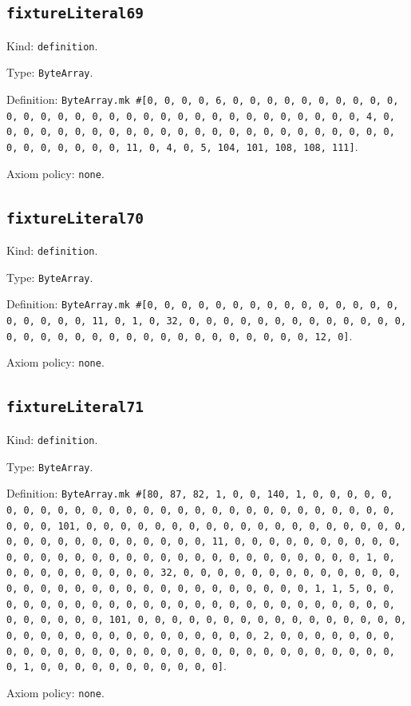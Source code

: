 \documentclass[11pt]{article}
\begin{document}
\subsection*{\texttt{fixtureLiteral69}}
\noindent Kind: \texttt{definition}.\par
\noindent Type: \texttt{ByteArray}.\par
\noindent Definition: \texttt{ByteArray.mk \#[0, 0, 0, 0, 6, 0, 0, 0, 0, 0, 0, 0, 0, 0, 0, 0, 0, 0, 0, 0, 0, 0, 0, 0, 0, 0, 0, 0, 0, 0, 0, 0, 0, 0, 0, 0, 4, 0, 0, 0, 0, 0, 0, 0, 0, 0, 0, 0, 0, 0, 0, 0, 0, 0, 0, 0, 0, 0, 0, 0, 0, 0, 0, 0, 0, 0, 0, 0, 11, 0, 4, 0, 5, 104, 101, 108, 108, 111]}.\par
\noindent Axiom policy: \texttt{none}.\par
\subsection*{\texttt{fixtureLiteral70}}
\noindent Kind: \texttt{definition}.\par
\noindent Type: \texttt{ByteArray}.\par
\noindent Definition: \texttt{ByteArray.mk \#[0, 0, 0, 0, 0, 0, 0, 0, 0, 0, 0, 0, 0, 0, 0, 0, 0, 0, 0, 0, 11, 0, 1, 0, 32, 0, 0, 0, 0, 0, 0, 0, 0, 0, 0, 0, 0, 0, 0, 0, 0, 0, 0, 0, 0, 0, 0, 0, 0, 0, 0, 0, 0, 0, 0, 0, 12, 0]}.\par
\noindent Axiom policy: \texttt{none}.\par
\subsection*{\texttt{fixtureLiteral71}}
\noindent Kind: \texttt{definition}.\par
\noindent Type: \texttt{ByteArray}.\par
\noindent Definition: \texttt{ByteArray.mk \#[80, 87, 82, 1, 0, 0, 140, 1, 0, 0, 0, 0, 0, 0, 0, 0, 0, 0, 0, 0, 0, 0, 0, 0, 0, 0, 0, 0, 0, 0, 0, 0, 0, 0, 0, 0, 0, 0, 0, 101, 0, 0, 0, 0, 0, 0, 0, 0, 0, 0, 0, 0, 0, 0, 0, 0, 0, 0, 0, 0, 0, 0, 0, 0, 0, 0, 0, 0, 0, 0, 0, 11, 0, 0, 0, 0, 0, 0, 0, 0, 0, 0, 0, 0, 0, 0, 0, 0, 0, 0, 0, 0, 0, 0, 0, 0, 0, 0, 0, 0, 0, 0, 0, 1, 0, 0, 0, 0, 0, 0, 0, 0, 0, 0, 32, 0, 0, 0, 0, 0, 0, 0, 0, 0, 0, 0, 0, 0, 0, 0, 0, 0, 0, 0, 0, 0, 0, 0, 0, 0, 0, 0, 0, 0, 0, 0, 1, 1, 5, 0, 0, 0, 0, 0, 0, 0, 0, 0, 0, 0, 0, 0, 0, 0, 0, 0, 0, 0, 0, 0, 0, 0, 0, 0, 0, 0, 0, 0, 0, 0, 101, 0, 0, 0, 0, 0, 0, 0, 0, 0, 0, 0, 0, 0, 0, 0, 0, 0, 0, 0, 0, 0, 0, 0, 0, 0, 0, 0, 0, 0, 0, 0, 2, 0, 0, 0, 0, 0, 0, 0, 0, 0, 0, 0, 0, 0, 0, 0, 0, 0, 0, 0, 0, 0, 0, 0, 0, 0, 0, 0, 0, 0, 0, 0, 1, 0, 0, 0, 0, 0, 0, 0, 0, 0, 0, 0]}.\par
\noindent Axiom policy: \texttt{none}.\par
\end{document}
